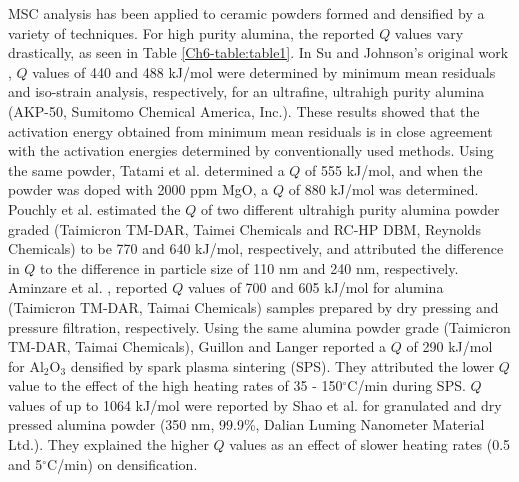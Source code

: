MSC analysis has been applied to ceramic powders formed and densified by a variety of techniques. For high purity alumina, the reported $Q$ values vary drastically, as seen in Table \ref{Ch6-table:table1}. In Su and Johnson's original work \cite{Su1996a}, $Q$ values of 440 and 488 kJ/mol were determined by minimum mean residuals and iso-strain analysis, respectively, for an ultrafine, ultrahigh purity alumina (AKP-50, Sumitomo Chemical America, Inc.). These results showed that the activation energy obtained from minimum mean residuals is in close agreement with the activation energies determined by conventionally used methods. Using the same powder, Tatami et al. \cite{Tatami2006} determined a $Q$ of 555 kJ/mol, and when the powder was doped with 2000 ppm MgO, a $Q$ of 880 kJ/mol was determined. Pouchly et al. \cite{Pouchly2009} estimated the $Q$ of two different ultrahigh purity alumina powder graded (Taimicron TM-DAR, Taimei Chemicals and RC-HP DBM, Reynolds Chemicals) to be 770 and 640 kJ/mol, respectively, and attributed the difference in $Q$ to the difference in particle size of 110 nm and 240 nm, respectively. Aminzare et al. \cite{Aminzare2010}, reported $Q$ values of 700 and 605 kJ/mol for alumina (Taimicron TM-DAR, Taimai Chemicals) samples prepared by dry pressing and pressure filtration, respectively. Using the same alumina powder grade (Taimicron TM-DAR, Taimai Chemicals), Guillon and Langer \cite{Guillon2010} reported a $Q$ of 290 kJ/mol for Al$_{2}$O$_{3}$ densified by spark plasma sintering (SPS). They attributed the lower $Q$ value to the effect of the high heating rates of 35 - 150$^{\circ}$C/min during SPS. $Q$ values of up to 1064 kJ/mol were reported by Shao et al. \cite{Shao2009} for granulated and dry pressed alumina powder (350 nm, 99.9\%, Dalian Luming Nanometer Material Ltd.). They explained the higher $Q$ values as an effect of slower heating rates (0.5 and 5$^{\circ}$C/min) on densification.

